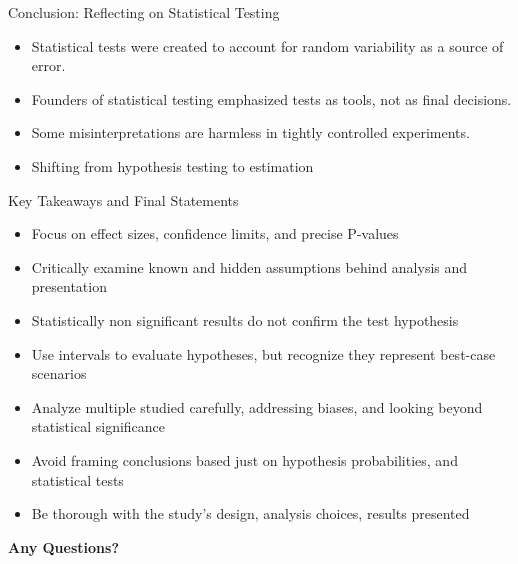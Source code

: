 \documentclass[aspectratio=169, 12pt]{beamer}
\begin{document}
\begin{frame}{Conclusion: Reflecting on Statistical Testing}
\begin{itemize}
    \item Statistical tests were created to account for random variability as a source of error.
    \vspace{0.5cm}
    \item Founders of statistical testing emphasized tests as tools, not as final decisions.
    \vspace{0.5cm}
    \item Some misinterpretations are harmless in tightly controlled experiments.
    \vspace{0.5cm}
    \item Shifting from hypothesis testing to estimation
\end{itemize}
\end{frame}

\begin{frame}{Key Takeaways and Final Statements}
\begin{itemize}
    \item Focus on effect sizes, confidence limits, and precise P-values
    \item Critically examine known and hidden assumptions behind analysis and presentation
    \item Statistically non significant results do not confirm the test hypothesis
    \item Use intervals to evaluate hypotheses, but recognize they represent best-case scenarios
    \item Analyze multiple studied carefully, addressing biases, and looking beyond statistical significance
    \item Avoid framing conclusions based just on hypothesis probabilities, and statistical tests
    \item Be thorough with the study's design, analysis choices, results presented
\end{itemize}
\end{frame}

\begin{frame}[plain]
    \begin{center}
        {\Huge \textbf{\textcolor{structure}{Any Questions?}}}
    \end{center}
\end{frame}
\end{document}
